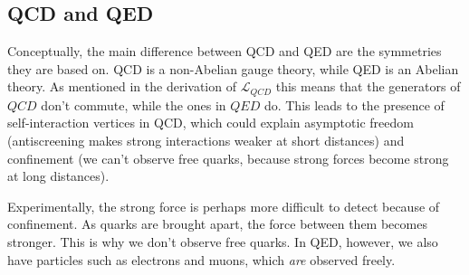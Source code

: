 \documentclass[11pt]{article}
\begin{document}
\begin{multicols}{2}
\subsection*{QCD and QED}
\begin{flushleft}
Conceptually, the main difference between QCD and QED are the symmetries they are based on. QCD is a non-Abelian gauge theory, while QED is an Abelian theory. As mentioned in the derivation of $\mathcal{L}_{QCD}$ this means that the generators of $QCD$ don't commute, while the ones in $QED$ do. This leads to the presence of self-interaction vertices in QCD, which could explain asymptotic freedom (antiscreening makes strong interactions weaker at short distances) and confinement (we can't observe free quarks, because strong forces become strong at long distances).
\end{flushleft}

\begin{flushleft}
Experimentally, the strong force is perhaps more difficult to detect because of confinement. As quarks are brought apart, the force between them becomes stronger. This is why we don't observe free quarks. In QED, however, we also have particles such as electrons and muons, which \textit{are} observed freely.
\end{flushleft}



\end{multicols}
\end{document}
